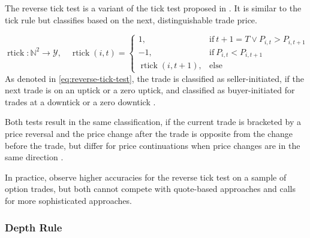 
The reverse tick test is a variant of the tick test proposed in \textcite[][241]{hasbrouckTradesQuotesInventories1988}. It is similar to the tick rule but classifies based on the next, distinguishable trade price.

\begin{equation}
    \operatorname{rtick} \colon \mathbb{N}^2 \to \mathcal{Y},\quad
    \operatorname{rtick}(i, t)=
    \begin{cases}
        1,                            & \mathrm{if}\ t+1=T \lor P_{i, t} > P_{i, t+1} \\
        -1,                           & \mathrm{if}\ P_{i, t} < P_{i, t+1}            \\
        \operatorname{rtick}(i, t+1), & \mathrm{else}
    \end{cases}
    \label{eq:reverse-tick-test}
\end{equation}
As denoted in \cref{eq:reverse-tick-test}, the trade is classified as seller-initiated, if the next trade is on an uptick or a zero uptick, and classified as buyer-initiated for trades at a downtick or a zero downtick \autocite[][735--636]{leeInferringTradeDirection1991}.

Both tests result in the same classification, if the current trade is bracketed by a price reversal and the price change after the trade is opposite from the change before the trade, but differ for price continuations when price changes are in the same direction \autocite[][736]{leeInferringTradeDirection1991}.

In practice, \textcite[][29--32]{grauerOptionTradeClassification2022} observe higher accuracies for the reverse tick test on a sample of option trades, but both cannot compete with quote-based approaches and calls for more sophisticated approaches.

\subsubsection{Depth Rule}\label{sec:depth-rule}


